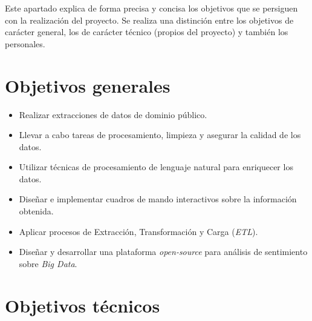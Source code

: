 
Este apartado explica de forma precisa y concisa los objetivos que se persiguen con la realización del proyecto. Se realiza una distinción entre los objetivos de carácter general, los de carácter técnico (propios del proyecto) y también los personales.

\section{Objetivos generales}

\begin{itemize}
    \item Realizar extracciones de datos de dominio público.

    \item Llevar a cabo tareas de procesamiento, limpieza y asegurar la calidad de los datos.

    \item Utilizar técnicas de procesamiento de lenguaje natural para enriquecer los datos.

    \item Diseñar e implementar cuadros de mando interactivos sobre la información obtenida.

    \item Aplicar procesos de Extracción, Transformación y Carga (\textit{ETL}).

    \item Diseñar y desarrollar una plataforma \textit{open-source} para análisis de sentimiento sobre \textit{Big Data}.
\end{itemize}

\section{Objetivos técnicos}

